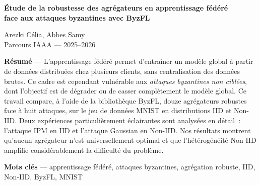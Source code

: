 \documentclass{article}
\begin{document}
\begin{center}
{\large\bfseries \'Etude de la robustesse des agr\'egateurs en apprentissage f\'ed\'er\'e\\
face aux attaques byzantines avec ByzFL}

\medskip
{\normalsize Arezki C\'elia, Abbes Samy}\\
{\small Parcours IAAA --- 2025--2026}
\end{center}

\medskip

\noindent\textbf{R\'esum\'e} ---
L'apprentissage f\'ed\'er\'e permet d'entra\^iner un mod\`ele global \`a partir de donn\'ees distribu\'ees
chez plusieurs clients, sans centralisation des donn\'ees brutes. Ce cadre est cependant vuln\'erable
aux \textit{attaques byzantines non cibl\'ees}, dont l'objectif est de d\'egrader ou de casser compl\`etement
le mod\`ele global. Ce travail compare, \`a l'aide de la biblioth\`eque ByzFL, douze agr\'egateurs robustes
face \`a huit attaques, sur le jeu de donn\'ees MNIST en distributions IID et Non-IID. Deux exp\'eriences
particuli\`erement \'eclairantes sont analys\'ees en d\'etail~: l'attaque IPM en IID et l'attaque Gaussian
en Non-IID. Nos r\'esultats montrent qu'aucun agr\'egateur n'est universellement optimal et que
l'h\'et\'erog\'en\'eit\'e Non-IID amplifie consid\'erablement la difficult\'e du probl\`eme.

\smallskip
\noindent\textbf{Mots cl\'es} --- apprentissage f\'ed\'er\'e, attaques byzantines, agr\'egation robuste,
IID, Non-IID, ByzFL, MNIST

\bigskip
\end{document}
